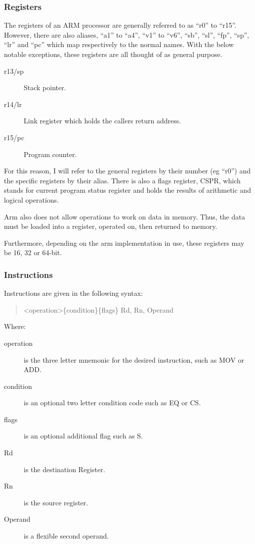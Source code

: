 			\subsubsection{Registers}
				The registers of an ARM processor are generally referred to as ``r0'' to ``r15''.
				However, there are also aliases, ``a1'' to ``a4'', ``v1'' to ``v6'', ``sb'', ``sl'', ``fp'', ``sp'', ``lr'' and ``pc'' which map respectively to the normal names.
				With the below notable exceptions, these registers are all thought of as general purpose.
				\begin{description}
					\item[r13/sp] Stack pointer.
					\item[r14/lr] Link register which holds the callers return address.
					\item[r15/pc] Program counter.
				\end{description}
				For this reason, I will refer to the general registers by their number (eg ``r0'') and the specific registers by their alias.
				There is also a flags register, CSPR, which stands for current program status register and holds the results of arithmetic and logical operations.

				Arm also does not allow operations to work on data in memory.
				Thus, the data must be loaded into a register, operated on, then returned to memory.

				Furthermore, depending on the arm implementation in use, these registers may be 16, 32 or 64-bit.

			\subsubsection{Instructions}
				Instructions are given in the following syntax:
				\begin{quote}
					<operation>\{condition\}\{flags\} Rd, Rn, Operand
				\end{quote}
				Where:
				\begin{description}
					\item[operation] is the three letter mnemonic for the desired instruction, such as MOV or ADD.
					\item[condition] is an optional two letter condition code such as EQ or CS.
					\item[flags] is an optional additional flag such as S.
					\item[Rd] is the destination Register.
					\item[Rn] is the source register.
					\item[Operand] is a flexible second operand.
				\end{description}

